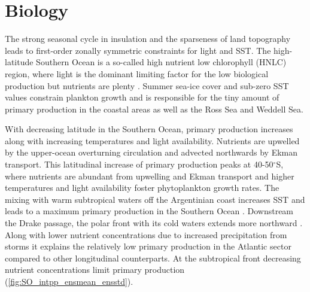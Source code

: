 \clearpage
\section{Biology}
\label{sec:biology}

The strong seasonal cycle in insulation and the sparseness of land topography leads to first-order zonally symmetric constraints for light and \ac{SST}. The high-latitude Southern Ocean is a so-called high nutrient low chlorophyll (HNLC) region, where light is the dominant limiting factor for the low biological production but nutrients are plenty \citep{Falkowski1998}. Summer sea-ice cover and sub-zero \acs{SST} values constrain plankton growth and is responsible for the tiny amount of primary production in the coastal areas as well as the Ross Sea and Weddell Sea. 

With decreasing latitude in the Southern Ocean, primary production increases along with increasing temperatures and light availability. Nutrients are upwelled by the upper-ocean overturning circulation and advected northwards by Ekman transport. This latitudinal increase of primary production peaks at 40-50$^\circ$S, where nutrients are abundant from upwelling and Ekman transport and higher temperatures and light availability foster phytoplankton growth rates. The mixing with warm subtropical waters off the Argentinian coast increases \acs{SST} and leads to a maximum primary production in the Southern Ocean \citep{Behrenfeld2014}. Downstream the Drake passage, the polar front with its cold waters extends more northward \citep{Orsi1995}. Along with lower nutrient concentrations due to increased precipitation from storms it explains the relatively low primary production in the Atlantic sector compared to other longitudinal counterparts. At the subtropical front decreasing nutrient concentrations limit primary production \citep{Behrenfeld2014} (\autoref{fig:SO_intpp_ensmean_ensstd}).\newline


